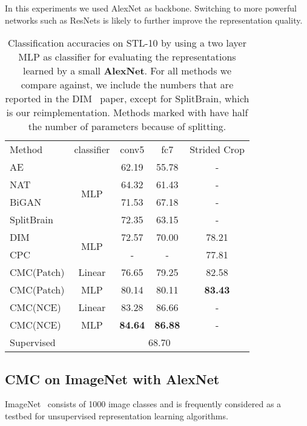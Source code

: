 \documentclass[10pt,twocolumn,letterpaper]{article}
\newcommand{\citep}[1]{\cite{#1}}
\begin{document}
In this experiments we used AlexNet as backbone. Switching to more powerful networks such as ResNets is likely to further improve the representation quality.

\begin{table}[t]
    \setlength{\tabcolsep}{5pt}
	\centering
	\small
    \begin{tabular}{l|c|cc|c}
    
    Method & classifier & conv5 & fc7 & Strided Crop \\
    \shline
    AE & \multirow{4}{*}{MLP} &62.19 & 55.78 & - \\
    NAT~\citep{bojanowski2017unsupervised} &  & 64.32 & 61.43 & - \\
    BiGAN~\citep{donahue2016adversarial} &  & 71.53 & 67.18 & - \\
    SplitBrain~\citep{zhang2017split} &  & 72.35 & 63.15 & - \\
    \hline
    DIM~\citep{hjelm2018learning} & \multirow{2}{*}{MLP} & 72.57 & 70.00 & 78.21 \\
    CPC~\citep{oord2018representation} & & - & - & 77.81 \\
    \hline
    CMC(Patch) & Linear & 76.65 & 79.25 & 82.58 \\
    CMC(Patch) & MLP & 80.14 & 80.11 & \textbf{83.43} \\
    CMC(NCE) & Linear & 83.28 & 86.66 & - \\
    CMC(NCE) & MLP & \textbf{84.64} & \textbf{86.88} & - \\
    \hline
    Supervised & \multicolumn{4}{c}{68.70} \\
    \end{tabular}
    \caption{\small{Classification accuracies on STL-10 by using a two layer MLP as classifier for evaluating the representations learned by a small \textbf{AlexNet}. For all methods we compare against, we include the numbers that are reported in the DIM~\citep{hjelm2018learning} paper, except for SplitBrain, which is our reimplementation. Methods marked with  have half the number of parameters because of splitting.}}
    \label{tbl:stl10}
\end{table} 
\subsection{CMC on ImageNet with AlexNet}

ImageNet~\citep{deng2009imagenet} consists of 1000 image classes and is frequently considered as a testbed for unsupervised representation learning algorithms.
\end{document}

